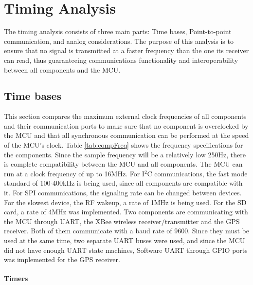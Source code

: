 \section{Timing Analysis}
The timing analysis consists of three main parts: Time bases, Point-to-point communication, and analog considerations. The purpose of this analysis is to ensure that no signal is transmitted at a faster frequency than the one its receiver can read, thus guaranteeing communications functionality and interoperability between all components and the MCU.

\subsection{Time bases}
This section compares the maximum external clock frequencies of all components and their communication ports to make sure that no component is overclocked by the MCU and that all synchronous communication can be performed at the speed of the MCU's clock. Table \ref{tab:compFreq} shows the frequency specifications for the components.  Since the sample frequency will be a relatively low 250Hz, there is complete compatibility between the MCU and all components. The MCU can run at a clock frequency of up to 16MHz. For I$^2$C communications, the fast mode standard of 100-400kHz is being used, since all components are compatible with it. For SPI communications, the signaling rate can be changed between devices. For the slowest device, the RF wakeup, a rate of 1MHz is being used. For the SD card, a rate of 4MHz was implemented. Two components are communicating with the MCU through UART, the XBee wireless receiver/transmitter and the GPS receiver. Both of them communicate with a baud rate of 9600. Since they must be used at the same time, two separate UART buses were used, and since the MCU did not have enough UART state machines, Software UART through GPIO ports was implemented for the GPS receiver.

\paragraph{Timers}

